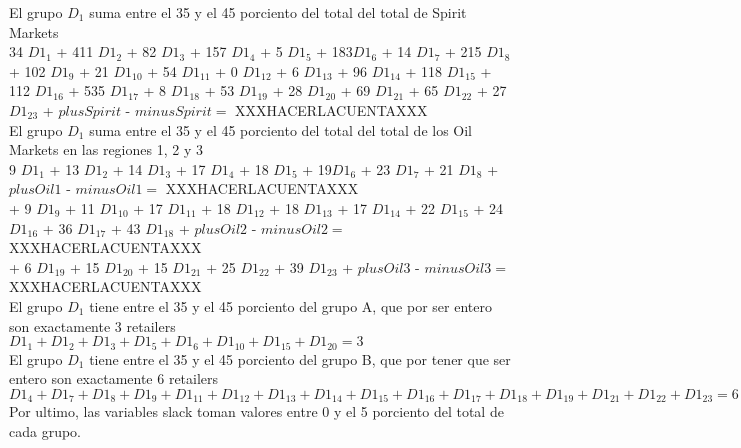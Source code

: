 El grupo $D_1$ suma entre el 35 y el 45 porciento del total del total de Spirit Markets \\

34 ${D1}_1$
+ 411 ${D1}_2$
+ 82 ${D1}_3$
+ 157 ${D1}_4$
+ 5 ${D1}_5$
+ 183${D1}_6$
+ 14 ${D1}_7$
+ 215 ${D1}_8$
+ 102 ${D1}_9$
+ 21 ${D1}_{10}$
+ 54 ${D1}_{11}$
+ 0 ${D1}_{12}$
+ 6 ${D1}_{13}$
+ 96 ${D1}_{14}$
+ 118 ${D1}_{15}$
+ 112 ${D1}_{16}$
+ 535 ${D1}_{17}$
+ 8 ${D1}_{18}$
+ 53 ${D1}_{19}$
+ 28 ${D1}_{20}$
+ 69 ${D1}_{21}$
+ 65 ${D1}_{22}$
+ 27 ${D1}_{23}$
+ $plusSpirit$ - $minusSpirit = $ XXXHACERLACUENTAXXX \\

El grupo $D_1$ suma entre el 35 y el 45 porciento del total del total de los Oil Markets en las regiones 1, 2 y 3 \\


9 ${D1}_1$
+ 13 ${D1}_2$
+ 14 ${D1}_3$
+ 17 ${D1}_4$
+ 18 ${D1}_5$
+ 19${D1}_6$
+ 23 ${D1}_7$
+ 21 ${D1}_8$
+ $plusOil1$ - $minusOil1 = $ XXXHACERLACUENTAXXX \\



+ 9 ${D1}_9$
+ 11 ${D1}_{10}$
+ 17 ${D1}_{11}$
+ 18 ${D1}_{12}$
+ 18 ${D1}_{13}$
+ 17 ${D1}_{14}$
+ 22 ${D1}_{15}$
+ 24 ${D1}_{16}$
+ 36 ${D1}_{17}$
+ 43 ${D1}_{18}$
+ $plusOil2$ - $minusOil2 = $ XXXHACERLACUENTAXXX \\


+ 6 ${D1}_{19}$
+ 15 ${D1}_{20}$
+ 15 ${D1}_{21}$
+ 25 ${D1}_{22}$
+ 39 ${D1}_{23}$
+ $plusOil3$ - $minusOil3 = $ XXXHACERLACUENTAXXX \\

El grupo $D_1$ tiene entre el 35 y el 45 porciento del grupo A, que por ser entero son exactamente 3 retailers \\


${D1}_1 + {D1}_2 + {D1}_3 + {D1}_5 + {D1}_6 + {D1}_{10} + {D1}_{15} + {D1}_{20} = 3$ \\


El grupo $D_1$ tiene entre el 35 y el 45 porciento del grupo B, que por tener que ser entero son exactamente 6 retailers \\


${D1}_4 + {D1}_7 + {D1}_8 + {D1}_9 + {D1}_{11} + {D1}_{12} + {D1}_{13} + {D1}_{14} + {D1}_{15} + {D1}_{16}
  + {D1}_{17} + {D1}_{18} + {D1}_{19} + {D1}_{21} + {D1}_{22} + {D1}_{23}   = 6$ \\


Por ultimo, las variables slack toman valores entre 0 y el 5 porciento del total de cada grupo.\\



